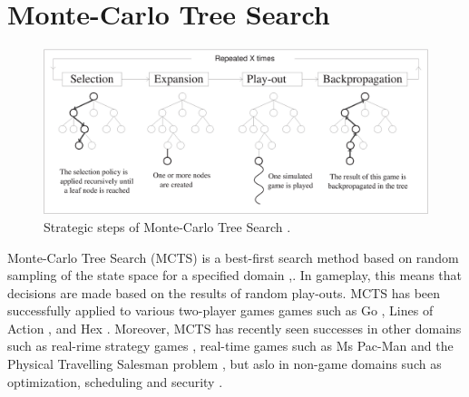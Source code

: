 \documentclass{ecai2010}
\begin{document}
\section{Monte-Carlo Tree Search}
\label{sec:mcts}
\begin{figure}[ht]
	\centering
	\includegraphics[width=.45\textwidth]{img/figure1.eps}
	\caption{Strategic steps of Monte-Carlo Tree Search \cite{chaslot2008progressive}.}
	\label{fig:mcts-algorithm}
\end{figure}
Monte-Carlo Tree Search (MCTS) is a best-first search method based on random sampling of the state space for a specified domain \cite{kocsis2006bandit},\cite{coulom2007efficient}. In gameplay, this means that decisions are made based on the results of random play-outs. MCTS has been successfully applied to various two-player games games such as Go \cite{lee2010current}, Lines of Action \cite{Winands2010b}, and Hex \cite{arneson2010monte}. Moreover, MCTS has recently seen successes in other domains such as real-rime strategy games \cite{browne2012survey}, real-time games such as Ms Pac-Man \cite{enhancementspacmancig12} and the Physical Travelling Salesman problem \cite{powleytsp}, but aslo in non-game domains such as optimization, scheduling and security \cite{browne2012survey}.
\end{document}
